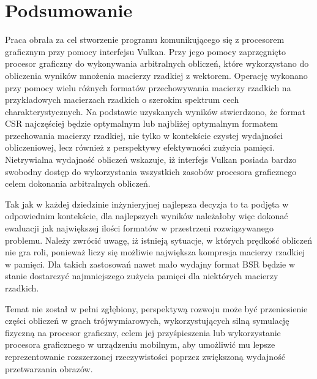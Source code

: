 \chapter{Podsumowanie}
\label{cha:podsumowanie}

Praca obrała za cel stworzenie programu komunikującego się z procesorem graficznym przy pomocy interfejsu Vulkan.
Przy jego pomocy zaprzęgnięto procesor graficzny do wykonywania arbitralnych obliczeń, które wykorzystano do obliczenia wyników mnożenia macierzy rzadkiej z wektorem.
Operację wykonano przy pomocy wielu różnych formatów przechowywania macierzy rzadkich na przykładowych macierzach rzadkich o szerokim spektrum cech charakterystycznych.
Na podstawie uzyskanych wyników stwierdzono, że format CSR najczęściej będzie optymalnym lub najbliżej optymalnym formatem przechowania macierzy rzadkiej, nie tylko w kontekście czystej wydajności obliczeniowej, lecz również z perspektywy efektywności zużycia pamięci.
Nietrywialna wydajność obliczeń wskazuje, iż interfejs Vulkan posiada bardzo swobodny dostęp do wykorzystania wszystkich zasobów procesora graficznego celem dokonania arbitralnych obliczeń.

Tak jak w każdej dziedzinie inżynieryjnej najlepsza decyzja to ta podjęta w odpowiednim kontekście, dla najlepszych wyników należałoby więc dokonać ewaluacji jak największej ilości formatów w przestrzeni rozwiązywanego problemu.
Należy zwrócić uwagę, iż istnieją sytuacje, w których prędkość obliczeń nie gra roli, ponieważ liczy się możliwie największa kompresja macierzy rzadkiej w pamięci.
Dla takich zastosowań nawet mało wydajny format BSR będzie w stanie dostarczyć najmniejszego zużycia pamięci dla niektórych macierzy rzadkich.

Temat nie został w pełni zgłębiony, perspektywą rozwoju może być przeniesienie części obliczeń w grach trójwymiarowych, wykorzystujących silną symulację fizyczną na procesor graficzny, celem jej przyśpieszenia lub wykorzystanie procesora graficznego w urządzeniu mobilnym, aby umożliwić mu lepsze reprezentowanie rozszerzonej rzeczywistości poprzez zwiększoną wydajność przetwarzania obrazów.